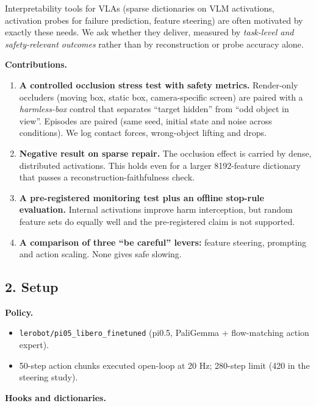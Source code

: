 \documentclass[
  10pt,
]{article}
\providecommand{\tightlist}{%
  \setlength{\itemsep}{0pt}\setlength{\parskip}{0pt}}
\begin{document}
Interpretability tools for VLAs (sparse dictionaries on VLM activations,
activation probes for failure prediction, feature steering) are often
motivated by exactly these needs. We ask whether they deliver, measured
by \emph{task-level and safety-relevant outcomes} rather than by
reconstruction or probe accuracy alone.

\textbf{Contributions.}

\begin{enumerate}
\def\labelenumi{\arabic{enumi}.}
\tightlist
\item
  \textbf{A controlled occlusion stress test with safety metrics.}
  Render-only occluders (moving box, static box, camera-specific screen)
  are paired with a \emph{harmless-box} control that separates ``target
  hidden'' from ``odd object in view''. Episodes are paired (same seed,
  initial state and noise across conditions). We log contact forces,
  wrong-object lifting and drops.
\item
  \textbf{Negative result on sparse repair.} The occlusion effect is
  carried by dense, distributed activations. This holds even for a
  larger 8192-feature dictionary that passes a
  reconstruction-faithfulness check.
\item
  \textbf{A pre-registered monitoring test plus an offline stop-rule
  evaluation.} Internal activations improve harm interception, but
  random feature sets do equally well and the pre-registered claim is
  not supported.
\item
  \textbf{A comparison of three ``be careful'' levers:} feature
  steering, prompting and action scaling. None gives safe slowing.
\end{enumerate}

\hypertarget{setup}{%
\subsection{2. Setup}\label{setup}}

\textbf{Policy.}

\begin{itemize}
\tightlist
\item
  \texttt{lerobot/pi05\_libero\_finetuned} (pi0.5, PaliGemma +
  flow-matching action expert).
\item
  50-step action chunks executed open-loop at 20 Hz; 280-step limit (420
  in the steering study).
\end{itemize}

\textbf{Hooks and dictionaries.}
\end{document}
